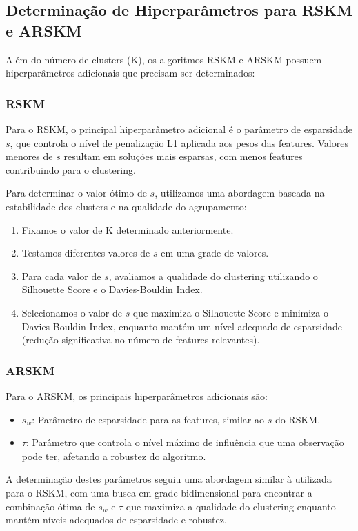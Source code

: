 \documentclass[conference]{IEEEtran}
\begin{document}
\subsection{Determinação de Hiperparâmetros para RSKM e ARSKM}
Além do número de clusters (K), os algoritmos RSKM e ARSKM possuem hiperparâmetros adicionais que precisam ser determinados:

\subsubsection{RSKM}
Para o RSKM, o principal hiperparâmetro adicional é o parâmetro de esparsidade $s$, que controla o nível de penalização L1 aplicada aos pesos das features. Valores menores de $s$ resultam em soluções mais esparsas, com menos features contribuindo para o clustering.

Para determinar o valor ótimo de $s$, utilizamos uma abordagem baseada na estabilidade dos clusters e na qualidade do agrupamento:

\begin{enumerate}
    \item Fixamos o valor de K determinado anteriormente.
    \item Testamos diferentes valores de $s$ em uma grade de valores.
    \item Para cada valor de $s$, avaliamos a qualidade do clustering utilizando o Silhouette Score e o Davies-Bouldin Index.
    \item Selecionamos o valor de $s$ que maximiza o Silhouette Score e minimiza o Davies-Bouldin Index, enquanto mantém um nível adequado de esparsidade (redução significativa no número de features relevantes).
\end{enumerate}

\subsubsection{ARSKM}
Para o ARSKM, os principais hiperparâmetros adicionais são:

\begin{itemize}
    \item $s_w$: Parâmetro de esparsidade para as features, similar ao $s$ do RSKM.
    \item $\tau$: Parâmetro que controla o nível máximo de influência que uma observação pode ter, afetando a robustez do algoritmo.
\end{itemize}

A determinação destes parâmetros seguiu uma abordagem similar à utilizada para o RSKM, com uma busca em grade bidimensional para encontrar a combinação ótima de $s_w$ e $\tau$ que maximiza a qualidade do clustering enquanto mantém níveis adequados de esparsidade e robustez.
\end{document}
